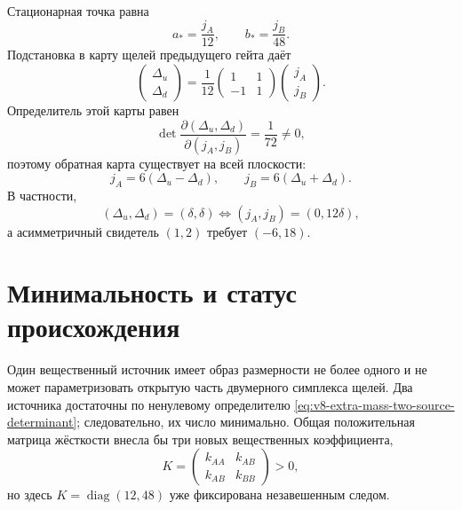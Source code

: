 Стационарная точка равна
\begin{equation}
 a_*=\frac{j_A}{12},\qquad b_*=\frac{j_B}{48}.
 \label{eq:v8-extra-mass-two-source-minimum}
\end{equation}
Подстановка в карту щелей предыдущего гейта даёт
\begin{equation}
 \begin{pmatrix}\Delta_u\\\Delta_d\end{pmatrix}
 =\frac1{12}
 \begin{pmatrix}1&1\\-1&1\end{pmatrix}
 \begin{pmatrix}j_A\\j_B\end{pmatrix}.
 \label{eq:v8-extra-mass-two-source-gap-map}
\end{equation}
Определитель этой карты равен
\begin{equation}
 \det\frac{\partial(\Delta_u,\Delta_d)}
 {\partial(j_A,j_B)}=\frac1{72}\ne0,
 \label{eq:v8-extra-mass-two-source-determinant}
\end{equation}
поэтому обратная карта существует на всей плоскости:
\begin{equation}
 j_A=6(\Delta_u-\Delta_d),\qquad
 j_B=6(\Delta_u+\Delta_d).
 \label{eq:v8-extra-mass-two-source-inverse}
\end{equation}
В частности,
\begin{equation}
 (\Delta_u,\Delta_d)=(\delta,\delta)
 \Longleftrightarrow (j_A,j_B)=(0,12\delta),
 \label{eq:v8-extra-mass-two-source-equal-witness}
\end{equation}
а асимметричный свидетель $(1,2)$ требует $(-6,18)$.

\section{Минимальность и статус происхождения}

Один вещественный источник имеет образ размерности не более одного и не
может параметризовать открытую часть двумерного симплекса щелей. Два
источника достаточны по ненулевому определителю
\eqref{eq:v8-extra-mass-two-source-determinant}; следовательно, их число
минимально. Общая положительная матрица жёсткости внесла бы три новых
вещественных коэффициента,
\begin{equation}
 K=\begin{pmatrix}k_{AA}&k_{AB}\\k_{AB}&k_{BB}\end{pmatrix}>0,
 \label{eq:v8-extra-mass-two-source-general-stiffness}
\end{equation}
но здесь $K=\operatorname{diag}(12,48)$ уже фиксирована незавешенным следом.

